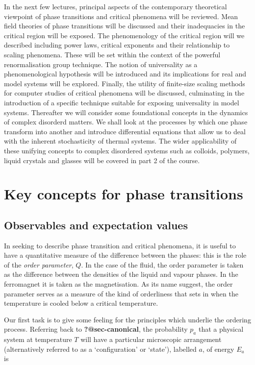 \documentclass[
  letterpaper,
  enabledeprecatedfontcommands]{report}
\begin{document}
In the next few lectures, principal aspects of the contemporary
theoretical viewpoint of phase transitions and critical phenomena will
be reviewed. Mean field theories of phase transitions will be discussed
and their inadequacies in the critical region will be exposed. The
phenomenology of the critical region will we described including power
laws, critical exponents and their relationship to scaling phenomena.
These will be set within the context of the powerful renormalisation
group technique. The notion of universality as a phenomenological
hypothesis will be introduced and its implications for real and model
systems will be explored. Finally, the utility of finite-size scaling
methods for computer studies of critical phenomena will be discussed,
culminating in the introduction of a specific technique suitable for
exposing universality in model systems. Thereafter we will consider some
foundational concepts in the dynamics of complex disorderd matters. We
shall look at the processes by which one phase transform into another
and introduce differential equations that allow us to deal with the
inherent stochasticity of thermal systems. The wider applicability of
these unifying concepts to complex disordered systems such as colloids,
polymers, liquid crystals and glasses will be covered in part 2 of the
course.

\chapter{Key concepts for phase transitions}\label{sec-background}

\section{Observables and expectation
values}\label{observables-and-expectation-values}

In seeking to describe phase transition and critical phenomena, it is
useful to have a quantitative measure of the difference between the
phases: this is the role of the \emph{order parameter}, \(Q\). In the
case of the fluid, the order parameter is taken as the difference
between the densities of the liquid and vapour phases. In the
ferromagnet it is taken as the magnetisation. As its name suggest, the
order parameter serves as a measure of the kind of orderliness that sets
in when the temperature is cooled below a critical temperature.

Our first task is to give some feeling for the principles which underlie
the ordering process. Referring back to \textbf{?@sec-canonical}, the
probability \(p_a\) that a physical system at temperature \(T\) will
have a particular microscopic arrangement (alternatively referred to as
a `configuration' or `state'), labelled \(a\), of energy \(E_a\) is
\end{document}
